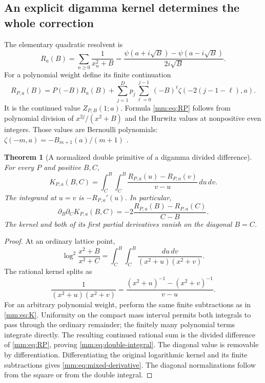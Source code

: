 \documentclass[11pt,a4paper]{article}
\numberwithin{equation}{section}
\newtheorem{theorem}{Theorem}[section]
\theoremstyle{definition}
\theoremstyle{remark}
\begin{document}
\subsection{An explicit digamma kernel determines the whole correction}

The elementary quadratic resolvent is
\begin{equation}\label{mm:eq:R}
 R_a(B)=\sum_{n\ge0}\frac1{x_n^2+B}
       =\frac{\psi(a+i\sqrt B)-\psi(a-i\sqrt B)}{2i\sqrt B}.
\end{equation}
For a polynomial weight define its finite continuation
\begin{equation}\label{mm:eq:RP}
 R_{P,a}(B)=P(-B)R_a(B)
    +\sum_{j=1}^{D}p_j\sum_{\ell=0}^{j-1}
                      (-B)^\ell\zeta(-2(j-1-\ell),a).
\end{equation}
It is the continued value $Z_{P,B}(1;a)$.  Formula
\eqref{mm:eq:RP} follows from polynomial division of
$x^{2j}/(x^2+B)$ and the Hurwitz values at nonpositive even integers.
Those values are Bernoulli polynomials:
$\zeta(-m,a)=-B_{m+1}(a)/(m+1)$ \cite{DLMFZeta}.

\begin{theorem}[A normalized double primitive of a digamma divided difference]
\label{mm:thm:integral}
For every $P$ and positive $B,C$,
\begin{equation}\label{mm:eq:double-integral}
 \boxed{\displaystyle
 K_{P,a}(B,C)=\int_C^B\!\int_C^B
              \frac{R_{P,a}(u)-R_{P,a}(v)}{v-u}\,du\,dv.}
\end{equation}
The integrand at $u=v$ is $-R_{P,a}'(u)$.  In particular,
\begin{equation}\label{mm:eq:mixed-derivative}
 \partial_B\partial_CK_{P,a}(B,C)
       =-2\frac{R_{P,a}(B)-R_{P,a}(C)}{C-B}.
\end{equation}
The kernel and both of its first partial derivatives vanish on the
diagonal $B=C$.
\end{theorem}
\begin{proof}
At an ordinary lattice point,
\[
 \log^2\frac{x^2+B}{x^2+C}
   =\int_C^B\!\int_C^B\frac{du\,dv}{(x^2+u)(x^2+v)}.
\]
The rational kernel splits as
\[
 \frac1{(x^2+u)(x^2+v)}
   =\frac{(x^2+u)^{-1}-(x^2+v)^{-1}}{v-u}.
\]
For an arbitrary polynomial weight, perform the same finite
subtractions as in \eqref{mm:eq:K}.  Uniformity on the compact mass
interval permits both integrals to pass through the ordinary remainder;
the finitely many polynomial terms integrate directly.  The resulting
continued rational sum is the divided difference of
\eqref{mm:eq:RP}, proving \eqref{mm:eq:double-integral}.
The diagonal value is removable by differentiation.  Differentiating
the original logarithmic kernel and its finite subtractions gives
\eqref{mm:eq:mixed-derivative}.  The diagonal normalizations follow
from the square or from the double integral.
\end{proof}
\end{document}
